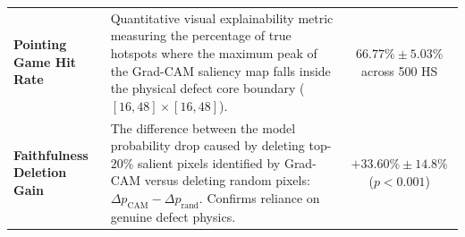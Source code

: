 \documentclass[conference]{IEEEtran}
\begin{document}
\begin{table}[t]
\begin{tabular}{p{4.2cm}p{10.5cm}c}
\addlinespace
\textbf{Pointing Game Hit Rate} & Quantitative visual explainability metric measuring the percentage of true hotspots where the maximum peak of the Grad-CAM saliency map falls inside the physical defect core boundary ($[16, 48] \times [16, 48]$). & $66.77\% \pm 5.03\%$ across 500 HS \\
\addlinespace
\textbf{Faithfulness Deletion Gain} & The difference between the model probability drop caused by deleting top-$20\%$ salient pixels identified by Grad-CAM versus deleting random pixels: $\Delta p_{\text{CAM}} - \Delta p_{\text{rand}}$. Confirms reliance on genuine defect physics. & $+33.60\% \pm 14.8\%$ ($p < 0.001$) \\
\bottomrule
\end{tabular}
\end{table}
\end{document}

